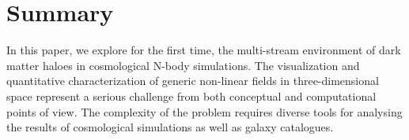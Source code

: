 


\section{Summary}
In this paper, we explore for the first time, the multi-stream environment of dark matter haloes in cosmological N-body simulations.
The visualization and quantitative characterization of generic non-linear fields in three-dimensional space represent a serious
challenge from both conceptual and computational points of view. The complexity of the problem requires diverse tools
for analysing the results of cosmological simulations as well as galaxy catalogues.




